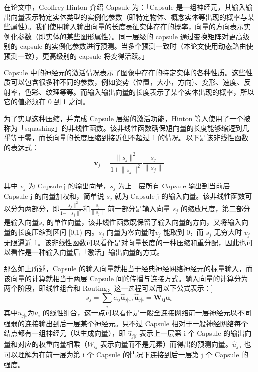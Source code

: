 在论文中，Geoffrey Hinton 介绍 Capsule 为：「Capsule 是一组神经元，其输入输出向量表示特定实体类型的实例化参数（即特定物体、概念实体等出现的概率与某些属性）。我们使用输入输出向量的长度表征实体存在的概率，向量的方向表示实例化参数（即实体的某些图形属性）。同一层级的 capsule 通过变换矩阵对更高级别的 capsule 的实例化参数进行预测。当多个预测一致时（本论文使用动态路由使预测一致），更高级别的 capsule 将变得活跃。」

Capsule 中的神经元的激活情况表示了图像中存在的特定实体的各种性质。这些性质可以包含很多种不同的参数，例如姿势（位置，大小，方向）、变形、速度、反射率，色彩、纹理等等。而输入输出向量的长度表示了某个实体出现的概率，所以它的值必须在 0 到 1 之间。

为了实现这种压缩，并完成 Capsule 层级的激活功能，Hinton 等人使用了一个被称为「squashing」的非线性函数。该非线性函数确保短向量的长度能够缩短到几乎等于零，而长向量的长度压缩到接近但不超过 1 的情况。以下是该非线性函数的表达式：
\begin{equation}\label{eq1:Squash}
\mathbf{v}_j=\frac{\|s_j\|^2}{1+\|s_j\|^2}\frac{s_j}{\|s_j\|}
\end{equation}

其中 $v_j$ 为 Capsule j 的输出向量，$s_j$ 为上一层所有 Capsule 输出到当前层 Capsule j 的向量加权和，简单说 $s_j$ 就为 Capsule j 的输入向量。该非线性函数可以分为两部分，即$\frac{\|s_j\|^2}{1+\|s_j\|^2}$和$\frac{s_j}{\|s_j\|}$
前一部分是输入向量 $s_j$ 的缩放尺度，第二部分是输入向量$s_j$ 的单位向量，该非线性函数既保留了输入向量的方向，又将输入向量的长度压缩到区间 [0,1) 内。$s_j$ 向量为零向量时$v_j$ 能取到 0，而 $s_j$ 无穷大时 $v_j$ 无限逼近 1。该非线性函数可以看作是对向量长度的一种压缩和重分配，因此也可以看作是一种输入向量后「激活」输出向量的方式。
 
 那么如上所述，Capsule 的输入向量就相当于经典神经网络神经元的标量输入，而该向量的计算就相当于两层 Capsule 间的传播与连接方式。输入向量的计算分为两个阶段，即线性组合和 Routing，这一过程可以用以下公式表示：]
\begin{equation}\label{eq2:Routing}
	s_j=\sum_{i}c_{ij}\hat{\mathbf{u}}_{j|u},\hat{\mathbf{u}}_{j|i}=\mathbf{W_{ij}}\mathbf{u}_i
\end{equation}
其中$\hat{u}_{j|i}$为$u_i$ 的线性组合，这一点可以看作是一般全连接网络前一层神经元以不同强弱的连接输出到后一层某个神经元。只不过 Capsule 相对于一般神经网络每个结点都有一组神经元（以生成向量），即 $\hat{u}_{j|i}$ 表示上一层第 i 个 Capsule 的输出向量和对应的权重向量相乘（$W_{ij}$ 表示向量而不是元素）而得出的预测向量。$\hat{u}_{j|i}$ 也可以理解为在前一层为第 i 个 Capsule 的情况下连接到后一层第 j 个 Capsule 的强度。

